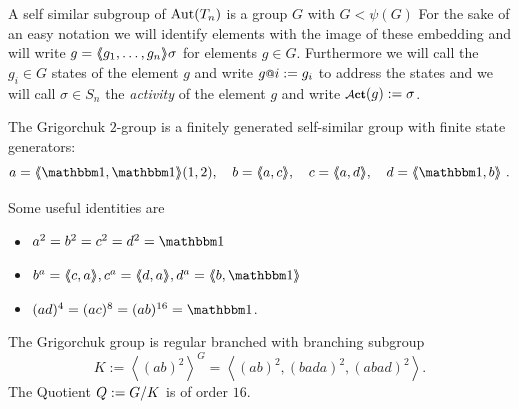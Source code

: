 \documentclass[a4paper,11pt]{amsart}
\begin{document}
A self similar subgroup of $\textup{Aut}(T_n)$ is a group $G$ with $G< \psi(G)$ For the sake of an easy notation we
will identify elements with the image of these embedding and will write $g=\langle\negthickspace\langle g_1,\ldots,g_n\rangle\negthickspace\rangle\sigma$ for elements $g\in G$. 
Furthermore we will call the $g_i\in G$ states of the element $g$ and write $g\at{i}:=g_i$ to address the states and we will
call $\sigma \in S_n$ the \emph{activity} of the element $g$ and write $\act(g):= \sigma$. 

The Grigorchuk $2$-group is a finitely generated self-similar group with finite state generators:
\[a=\pair{\id,\id}(1,2),\quad b=\pair{a,c},\quad c=\pair{a,d},\quad d=\pair{\id,b}\ . \]

Some useful identities are
\begin{itemize}
 \item $a^2=b^2=c^2=d^2=\id$ 
 \item $b^a= \pair{c,a}, c^a=\pair{d,a}, d^a=\pair{b,\id}$
 \item $(ad)^4=(ac)^8=(ab)^{16}= \id$.
\end{itemize}

\begin{lem}\label{lem:subgroupK}
The Grigorchuk group is regular branched with branching subgroup 
 \[K:= \left<(ab)^2\right>^G=\left< (ab)^2,(bada)^2,(abad)^2 \right>. \]
 The Quotient $Q := {G/K}$ is of order $16$.
\end{lem}
\end{document}
